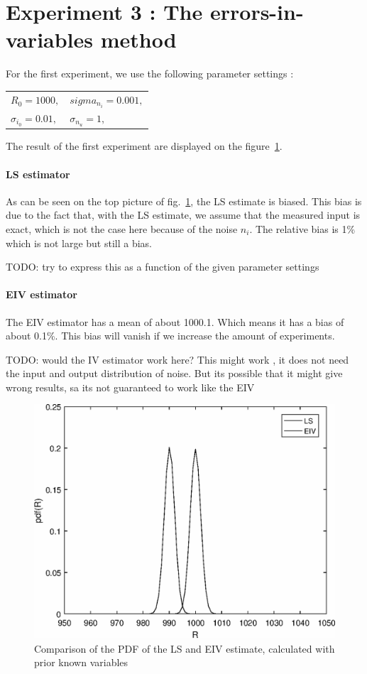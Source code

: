 \section{Experiment 3 : The errors-in-variables method}
For the first experiment, we use the following parameter settings : 

\begin{table}[h]
\centering
\begin{tabular}{ll}
    $ R_0 = 1000, $  &  $ sigma_{n_i} = 0.001, $   \\
    $ \sigma_{i_0} = 0.01, $  &  $ \sigma_{n_u} = 1, $   \\
\end{tabular}
\end{table}
The result of the first experiment are displayed on the figure~\ref{Sess1_part1_exp1}.

\paragraph{LS estimator} As can be seen on the top picture of fig.~\ref{Sess1_part1_exp1}, the LS estimate is biased. This bias is due to the fact that, with the LS estimate, we assume that the measured input is exact, which is not the case here because of the noise $n_i$. The relative bias is 1\% which is not large but still a bias.

TODO: try to express this as a function of the given parameter settings

\paragraph{EIV estimator} The EIV estimator has a mean of about 1000.1. Which means it has a bias of about 0.1\%. This bias will vanish if we increase the amount of experiments.

TODO: would the IV estimator work here? This might work , it does not need the input and output distribution of noise. But its possible that it might give wrong results, sa its not guaranteed to work like the EIV

\begin{figure}[H]
    \centering
    \includegraphics[width=1\textwidth]{figures/Sess1_part2.eps}
    \caption{Comparison of the PDF of the LS and EIV estimate, calculated with prior known variables}
    \label{Sess1_part1_exp1}
\end{figure}

